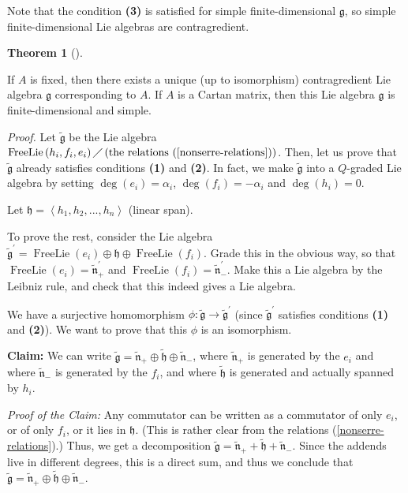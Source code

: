 \documentclass
[numbers=enddot,12pt,final,onecolumn,german,notitlepage]{scrartcl}%
\theoremstyle{definition}
\newtheorem{theo}{Theorem}
\newenvironment{theorem}[1][]
{\begin{theo}[#1]\begin{leftbar}}
{\end{leftbar}\end{theo}}
\begin{document}
Note that the condition \textbf{(3)} is satisfied for simple
finite-dimensional $\mathfrak{g}$, so simple finite-dimensional Lie algebras
are contragredient.

\begin{theorem}
If $A$ is fixed, then there exists a unique (up to isomorphism) contragredient
Lie algebra $\mathfrak{g}$ corresponding to $A$. If $A$ is a Cartan matrix,
then this Lie algebra $\mathfrak{g}$ is finite-dimensional and simple.
\end{theorem}

\textit{Proof.} Let $\widetilde{\mathfrak{g}}$ be the Lie algebra
$\operatorname*{FreeLie}\left(  h_{i},f_{i},e_{i}\right)  \diagup\left(
\text{the relations (\ref{nonserre-relations})}\right)  $. Then, let us prove
that $\widetilde{\mathfrak{g}}$ already satisfies conditions \textbf{(1)} and
\textbf{(2)}. In fact, we make $\widetilde{\mathfrak{g}}$ into a $Q$-graded
Lie algebra by setting $\deg\left(  e_{i}\right)  =\alpha_{i}$, $\deg\left(
f_{i}\right)  =-\alpha_{i}$ and $\deg\left(  h_{i}\right)  =0$.

Let $\mathfrak{h}=\left\langle h_{1},h_{2},...,h_{n}\right\rangle $ (linear span).

To prove the rest, consider the Lie algebra $\widetilde{\mathfrak{g}}^{\prime
}=\operatorname*{FreeLie}\left(  e_{i}\right)  \oplus\mathfrak{h}%
\oplus\operatorname*{FreeLie}\left(  f_{i}\right)  $. Grade this in the
obvious way, so that $\operatorname*{FreeLie}\left(  e_{i}\right)
=\widetilde{\mathfrak{n}}_{+}^{\prime}$ and $\operatorname*{FreeLie}\left(
f_{i}\right)  =\widetilde{\mathfrak{n}}_{-}^{\prime}$. Make this a Lie algebra
by the Leibniz rule, and check that this indeed gives a Lie algebra.

We have a surjective homomorphism $\phi:\widetilde{\mathfrak{g}}%
\rightarrow\widetilde{\mathfrak{g}}^{\prime}$ (since $\widetilde{\mathfrak{g}%
}^{\prime}$ satisfies conditions \textbf{(1)} and \textbf{(2)}). We want to
prove that this $\phi$ is an isomorphism.

\textbf{Claim:} We can write $\widetilde{\mathfrak{g}}=\widetilde{\mathfrak{n}%
}_{+}\oplus\widetilde{\mathfrak{h}}\oplus\widetilde{\mathfrak{n}}_{-}$, where
$\widetilde{\mathfrak{n}}_{+}$ is generated by the $e_{i}$ and where
$\widetilde{\mathfrak{n}}_{-}$ is generated by the $f_{i}$, and where
$\widetilde{\mathfrak{h}}$ is generated and actually spanned by $h_{i}$.

\textit{Proof of the Claim:} Any commutator can be written as a commutator of
only $e_{i}$, or of only $f_{i}$, or it lies in $\mathfrak{h}$. (This is
rather clear from the relations (\ref{nonserre-relations}).) Thus, we get a
decomposition $\widetilde{\mathfrak{g}}=\widetilde{\mathfrak{n}}%
_{+}+\widetilde{\mathfrak{h}}+\widetilde{\mathfrak{n}}_{-}$. Since the addends
live in different degrees, this is a direct sum, and thus we conclude that
$\widetilde{\mathfrak{g}}=\widetilde{\mathfrak{n}}_{+}\oplus
\widetilde{\mathfrak{h}}\oplus\widetilde{\mathfrak{n}}_{-}$.
\end{document}
